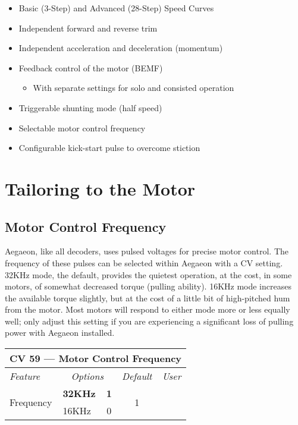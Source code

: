\documentclass[12pt,letterpaper,draft]{memoir} %
\begin{document}
\begin{itemize}
\item Basic (3-Step) and Advanced (28-Step) Speed Curves
\item Independent forward and reverse trim
\item Independent acceleration and deceleration (momentum)
\item Feedback control of the motor (BEMF)
\begin{itemize}
\item With separate settings for solo and consisted operation
\end{itemize}
\item Triggerable shunting mode (half speed)
\item Selectable motor control frequency
\item Configurable kick-start pulse to overcome stiction
\end{itemize}


\section{Tailoring to the Motor}
\label{TailoringToMotor}

\subsection{Motor Control Frequency}
\label{MotorControlFrequency}
Aegaeon, like all decoders, uses pulsed voltages for precise motor control. The frequency of these pulses can be selected within Aegaeon with a CV setting. 32KHz mode, the default, provides the quietest operation, at the cost, in some motors, of somewhat decreased torque (pulling ability). 16KHz mode increases the available torque slightly, but at the cost of a little bit of high-pitched hum from the motor. Most motors will respond to either mode more or less equally well; only adjust this setting if you are experiencing a significant loss of pulling power with Aegaeon installed.

\label{CV59}
\begin{center}
\begin{tabular}{|l|lc|c|c|}
\hline
\multicolumn{5}{|c|}{\textbf{CV 59 --- Motor Control Frequency}} \\ \hline \hline
\textit{Feature} & \multicolumn{2}{c|}{\textit{Options}} & \textit{Default} & \textit{User} \\ \hline
\multirow{2}{*}{Frequency}	& \textbf{32KHz}	& \textbf{1} 	& \multirow{2}{*}{1} 	&\\
			& 16KHz 		& 0 			& 				& \\ \hline
\end{tabular}
\end{center}
\end{document}
